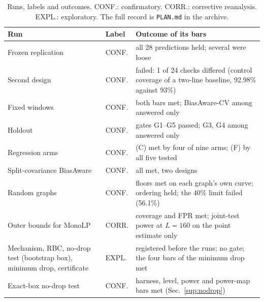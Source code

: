 \documentclass[aps,pre,twocolumn,superscriptaddress,nofootinbib,10pt]{revtex4-2}
\newcommand{\nm}[1]{\textsf{#1}}
\newcommand{\BAC}{\nm{BiasAware-CV}}
\newcommand{\BA}{\nm{BiasAware}}
\newcommand{\MLP}{\nm{MonoLP}}
\newcommand{\RBC}{\nm{RBC}}
\begin{document}
\begin{table}[t]
\caption{Runs, labels and outcomes. CONF.: confirmatory. CORR.: corrective reanalysis. EXPL.: exploratory. The full record is \texttt{PLAN.md} in the archive.}
\label{tab:ledger}
\begin{ruledtabular}
\footnotesize
\setlength{\tabcolsep}{2pt}
\begin{tabular}{p{}p{}p{}}
Run & Label & Outcome of its bars \\
\hline
Frozen replication & CONF. & all 28 predictions held; several were loose \\
Second design & CONF. & failed: 1 of 24 checks differed (control coverage of a two-line baseline, 92.98\% against 93\%) \\
Fixed windows & CONF. & both bars met; \BAC{} among answered only \\
Holdout & CONF. & gates G1--G5 passed; G3, G4 among answered only \\
Regression arms & CONF. & (C) met by four of nine arms; (F) by all five tested \\
Split-covariance \BA{} & CONF. & all met, two designs \\
Random graphs & CONF. & floors met on each graph's own curve; ordering held; the 40\% limit failed (56.1\%) \\
Outer bounds for \MLP{} & CORR. & coverage and FPR met; joint-test power at $L=160$ on the point estimate only \\
Mechanism, \RBC{}, no-drop test (bootstrap box), minimum drop, certificate & EXPL. & registered before the runs; no gate; the four bars of the minimum drop met \\
Exact-box no-drop test & CONF. & harness, level, power and power-map bars met (Sec.~\ref{sup:nodrop}) \\
\end{tabular}
\end{ruledtabular}
\end{table}
\end{document}
